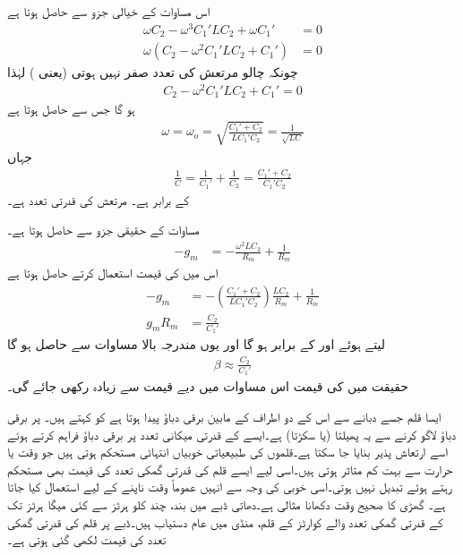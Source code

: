اس مساوات کے خیالی جزو سے حاصل ہوتا ہے
\begin{align*}
\omega C_2-\omega^3 C_1' L C_2 +\omega C_1' &=0\\
\omega \left(C_2-\omega^2 C_1' L C_2 + C_1'  \right )&=0
\end{align*}
چونکہ چالو مرتعش کی تعدد صفر نہیں ہوتی (یعنی ) لہٰذا
\begin{align*}
C_2-\omega^2 C_1' L C_2 + C_1'=0
\end{align*}
ہو گا جس سے حاصل ہوتا ہے
\begin{align}  \label{مساوات_مرتعش_ٹرانزسٹر_کالپٹس_تعدد}
\omega=\omega_o=\sqrt{\frac{C_1'+C_2}{L C_1' C_2}} =\frac{1}{\sqrt{LC}}
\end{align}
جہاں
\begin{align}
\frac{1}{C}=\frac{1}{C_1'}+\frac{1}{C_2}=\frac{C_1'+C_2}{C_1' C_2} 
\end{align}
کے برابر ہے۔ مرتعش کی قدرتی تعدد ہے۔

مساوات  کے حقیقی جزو سے حاصل ہوتا ہے۔
\begin{align*}
-g_m&=-\frac{\omega^2 L C_2}{R_m}+\frac{1}{R_m}
\end{align*}
اس میں  کی قیمت استعمال کرتے حاصل ہوتا ہے
\begin{align*}
-g_m&=-\left(\frac{C_1'+C_2}{L C_1' C_2} \right)\frac{L C_2}{R_m}+\frac{1}{R_m}\\
g_m R_m&=\frac{C_2}{C_1'}
\end{align*}
 لیتے ہوئے اور  کے برابر ہو گا اور یوں مندرجہ بالا مساوات سے حاصل ہو گا
\begin{align} \label{مساوات_مرتعش_ٹرانزسٹر_افزائش}
\beta \approx \frac{C_2}{C_1'}
\end{align}
حقیقت میں  کی قیمت اس مساوات میں دیے قیمت سے زیادہ رکھی جائے گی۔

ایسا قلم جسے دبانے سے اس کے دو اطراف کے مابین برقی دباؤ پیدا ہوتا ہے کو  کہتے ہیں۔  پر برقی دباؤ لاگو کرنے سے یہ پھیلتا (یا سکڑتا) ہے۔ایسے   کے قدرتی میکانی تعدد پر برقی دباؤ فراہم کرتے ہوئے اسے ارتعاش پذیر بنایا جا سکتا ہے۔قلموں کی طبیعیاتی خوبیاں انتہائی مستحکم ہوتی ہیں جو وقت یا حرارت سے بہت کم متاثر ہوتی ہیں۔اسی لیے ایسے قلم کی قدرتی گمکی تعدد کی قیمت بھی مستحکم  رہتے ہوئے تبدیل نہیں ہوتی۔اسی خوبی کی وجہ سے  انہیں عموماً وقت ناپنے کے لیے استعمال کیا جاتا ہے۔ گھڑی کا صحیح وقت دکھانا مثالی ہے۔دھاتی ڈبے میں بند، چند کلو ہرٹز  سے کئی میگا ہرٹز  تک کے قدرتی گمکی تعدد والے کوارٹز کے قلم، منڈی میں عام دستیاب ہیں۔ڈبے پر قلم کی قدرتی گمکی تعدد کی قیمت لکھی گئی ہوتی ہے۔
  

